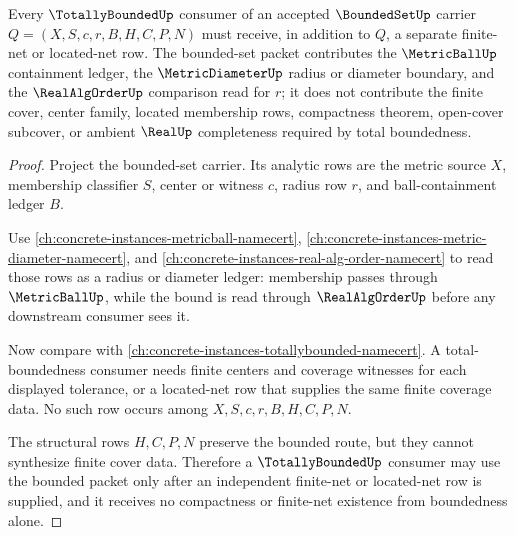 \begin{theorem}
\label{thm:boundedset-totally-bounded-consumer}
Every $\TotallyBoundedUp$ consumer of an accepted $\BoundedSetUp$ carrier $Q=(X,S,c,r,B,H,C,P,N)$ must receive, in addition to $Q$, a separate finite-net or located-net row. The bounded-set packet contributes the $\MetricBallUp$ containment ledger, the $\MetricDiameterUp$ radius or diameter boundary, and the $\RealAlgOrderUp$ comparison read for $r$; it does not contribute the finite cover, center family, located membership rows, compactness theorem, open-cover subcover, or ambient $\RealUp$ completeness required by total boundedness.
\end{theorem}
\begin{proof}
Project the bounded-set carrier. Its analytic rows are the metric source $X$, membership classifier $S$, center or witness $c$, radius row $r$, and ball-containment ledger $B$.

Use \autoref{ch:concrete-instances-metricball-namecert}, \autoref{ch:concrete-instances-metric-diameter-namecert}, and \autoref{ch:concrete-instances-real-alg-order-namecert} to read those rows as a radius or diameter ledger: membership passes through $\MetricBallUp$, while the bound is read through $\RealAlgOrderUp$ before any downstream consumer sees it.

Now compare with \autoref{ch:concrete-instances-totallybounded-namecert}. A total-boundedness consumer needs finite centers and coverage witnesses for each displayed tolerance, or a located-net row that supplies the same finite coverage data. No such row occurs among $X,S,c,r,B,H,C,P,N$.

The structural rows $H,C,P,N$ preserve the bounded route, but they cannot synthesize finite cover data. Therefore a $\TotallyBoundedUp$ consumer may use the bounded packet only after an independent finite-net or located-net row is supplied, and it receives no compactness or finite-net existence from boundedness alone.
\end{proof}

